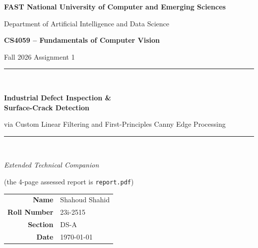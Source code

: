 \documentclass[11pt,a4paper]{article}
\begin{document}
\begin{titlepage}
  \centering
  \vspace*{1.5cm}
  {\Large\bfseries FAST National University of Computer and Emerging Sciences\par}
  \vspace{0.3cm}
  {\large Department of Artificial Intelligence and Data Science\par}
  \vspace{2.2cm}
  {\bfseries\Large CS4059 -- Fundamentals of Computer Vision\par}
  \vspace{0.4cm}
  {\large Fall 2026 \quad\textbullet\quad Assignment 1\par}
  \vspace{1.6cm}
  \rule{\linewidth}{0.5pt}\\[0.5cm]
  {\huge\bfseries Industrial Defect Inspection \&\\[0.3cm]
   Surface-Crack Detection\par}
  \vspace{0.4cm}
  {\large via Custom Linear Filtering and First-Principles Canny Edge Processing\par}
  \vspace{0.3cm}
  \rule{\linewidth}{0.5pt}\\[1.6cm]
  {\large\itshape Extended Technical Companion\par}
  \vspace{0.3cm}
  {\small (the 4-page assessed report is \texttt{report.pdf})\par}
  \vfill
  \begin{tabular}{rl}
    \textbf{Name}        & Shahoud Shahid \\
    \textbf{Roll Number} & 23i-2515 \\
    \textbf{Section}     & DS-A \\
    \textbf{Date}        & \today \\
  \end{tabular}
  \vspace{1cm}
\end{titlepage}

\tableofcontents
\clearpage
\listoffigures
\listoftables
\clearpage
{}

\begin{abstract}
\noindent This companion reproduces the assessed report and adds the material
that does not fit the 4-page limit: the full max-pooling Jacobian derivation,
a proof sketch of scale-space causality via the heat equation, complete
algorithm listings for every stage, the entire $3\times3$ sensitivity grid for
both datasets, and an appendix documenting assumptions and the
required-vs-enhancement split. All numbers are regenerated from seed
\num{2515} by .
\end{abstract}
\end{document}
